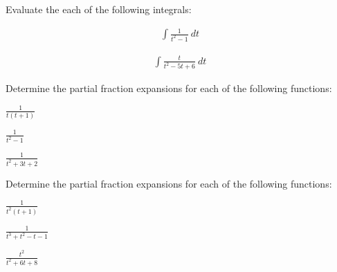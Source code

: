 

\begin{problem}
\item Evaluate the each of the following integrals:

  \begin{subproblem}
  \item 
    \begin{eqnarray*}
      \int \frac{1}{t^2-1} ~ dt 
    \end{eqnarray*}
    \vfill

  \item 
    \begin{eqnarray*}
      \int \frac{t}{t^2-5t+6} ~ dt
    \end{eqnarray*}
    \vfill

  \end{subproblem}
\end{problem}


\begin{problem}
\item Determine the partial fraction expansions for each of the following functions:

  \begin{subproblem}
  \item $\frac{1}{t(t+1)}$
    \vfill
  \item $\frac{1}{t^2-1}$
    \vfill
  \item $\frac{1}{t^2+3t+2}$
    \vfill
  \end{subproblem}


  \clearpage
\item Determine the partial fraction expansions for each of the following functions:

  \begin{subproblem}
  \item $\frac{1}{t^2(t+1)}$
    \vfill
  \item $\frac{1}{t^3+t^2-t-1}$
    \vfill
  \item $\frac{t^2}{t^2+6t+8}$
    \vfill
  \end{subproblem}


\end{problem}


